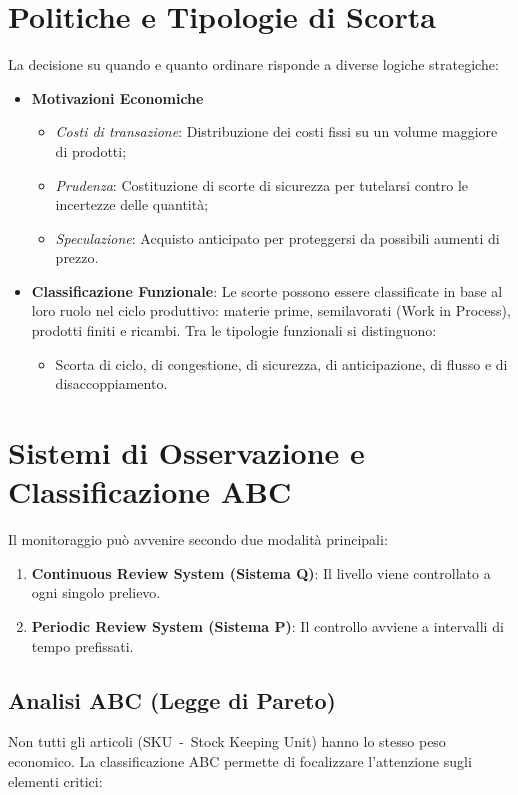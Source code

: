 \section{Politiche e Tipologie di Scorta}
La decisione su quando e quanto ordinare risponde a diverse logiche strategiche:
\begin{itemize}
    \item \textbf{Motivazioni Economiche}
          \begin{itemize}
              \item \emph{Costi di transazione}: Distribuzione dei costi fissi su un volume maggiore di prodotti;
              \item \emph{Prudenza}: Costituzione di scorte di sicurezza per tutelarsi contro le incertezze delle quantità;
              \item \emph{Speculazione}: Acquisto anticipato per proteggersi da possibili aumenti di prezzo.
          \end{itemize}
    \item \textbf{Classificazione Funzionale}: Le scorte possono essere classificate in base al loro ruolo nel ciclo produttivo: materie prime, semilavorati (Work in Process), prodotti finiti e ricambi. Tra le tipologie funzionali si distinguono:
          \begin{itemize}
              \item Scorta di ciclo, di congestione, di sicurezza, di anticipazione, di flusso e di disaccoppiamento.
          \end{itemize}
\end{itemize}

%
\section{Sistemi di Osservazione e Classificazione ABC}
Il monitoraggio può avvenire secondo due modalità principali:
\begin{enumerate}
    \item \textbf{Continuous Review System (Sistema Q)}: Il livello viene controllato a ogni singolo prelievo.
    \item \textbf{Periodic Review System (Sistema P)}: Il controllo avviene a intervalli di tempo prefissati.
\end{enumerate}

%
\subsection{Analisi ABC (Legge di Pareto)}
Non tutti gli articoli (SKU~-~Stock Keeping Unit) hanno lo stesso peso economico. La classificazione ABC permette di focalizzare l'attenzione sugli elementi critici:

